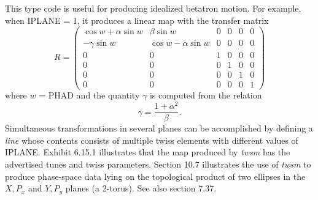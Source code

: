          This type code is useful for producing idealized betatron motion.
For example, when IPLANE = 1, it produces a linear map with the transfer
matrix
\begin{equation}
R = \left( \begin{array}{cccccc}
\cos w + \alpha\sin w & \beta\sin w & 0 & 0 & 0 & 0 \\
-\gamma\sin w & \cos w-\alpha\sin w & 0 & 0 & 0 & 0 \\
                              0 & 0 & 1 & 0 & 0 & 0 \\
                              0 & 0 & 0 & 1 & 0 & 0 \\
                              0 & 0 & 0 & 0 & 1 & 0 \\
                              0 & 0 & 0 & 0 & 0 & 1
\end{array}
\right)
\end{equation}
where $w$ = PHAD and the quantity $\gamma$ is computed from the relation
\begin{equation}
                            \gamma = \frac{1 + \alpha^2}{\beta}.
\end{equation}
Simultaneous transformations in several planes can be accomplished by
defining a {\em line } whose contents consists of multiple twiss elements with
different values of IPLANE\@.  Exhibit 6.15.1 illustrates that the map produced by
{\em twsm} has the advertised tunes and twiss parameters.  Section 10.7
illustrates the use of {\em twsm} to produce phase-space data lying on
the topological product of two ellipses in the $X,P_x$ and $Y,P_y$ planes
(a 2-torus).  See also section 7.37.

